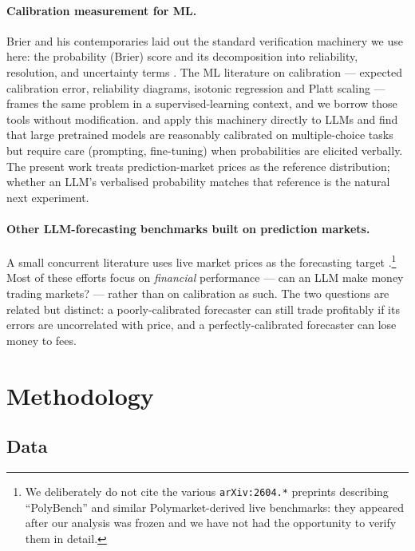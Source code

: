 \documentclass{article}
\begin{document}
\paragraph{Calibration measurement for ML.}
Brier and his contemporaries laid out the standard verification
machinery we use here: the probability (Brier) score
\citep{brier1950} and its decomposition into reliability, resolution,
and uncertainty terms \citep{murphy1973}. The ML literature on
calibration --- expected calibration error, reliability diagrams,
isotonic regression and Platt scaling
\citep{niculescu2005,naeini2015,guo2017} --- frames the same problem
in a supervised-learning context, and we borrow those tools without
modification. \citet{lin2022} and \citet{kadavath2022} apply this
machinery directly to LLMs and find that large pretrained models are
reasonably calibrated on multiple-choice tasks but require care
(prompting, fine-tuning) when probabilities are elicited verbally.
The present work treats prediction-market prices as the reference
distribution; whether an LLM's verbalised probability matches that
reference is the natural next experiment.

\paragraph{Other LLM-forecasting benchmarks built on prediction markets.}
A small concurrent literature uses live market prices as the
forecasting target \citep{lu2025}.\footnote{We deliberately do not
cite the various \texttt{arXiv:2604.*} preprints describing
``PolyBench'' and similar Polymarket-derived live benchmarks: they
appeared after our analysis was frozen and we have not had the
opportunity to verify them in detail.} Most of these efforts focus on
\emph{financial} performance --- can an LLM make money trading
markets? --- rather than on calibration as such. The two questions
are related but distinct: a poorly-calibrated forecaster can still
trade profitably if its errors are uncorrelated with price, and a
perfectly-calibrated forecaster can lose money to fees.

\section{Methodology}
\label{sec:method}

\subsection{Data}
\end{document}
